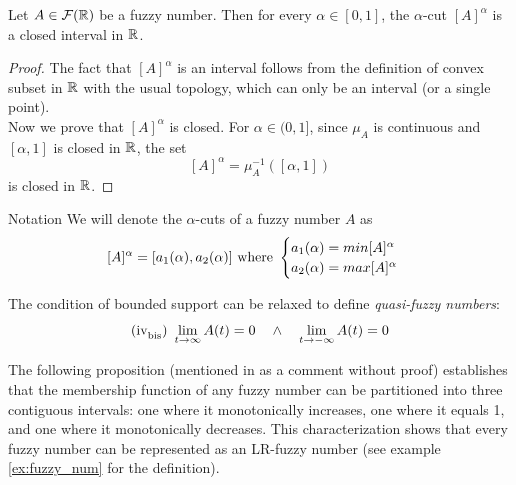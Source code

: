 \begin{proposition}
    Let $A\in \fuzzy{\R}$ be a fuzzy number. Then for every $\alpha \in [0,1]$, the $\alpha$-cut $[A]^\alpha$ is a closed interval in $\R$.
\end{proposition}

\begin{proof}
The fact that $[A]^\alpha$ is an interval follows from the definition of convex subset in $\R$ with the usual topology, which can only be an interval (or a single point).\\
Now we prove that $[A]^\alpha$ is closed. For $\alpha \in (0,1]$, since $\mu_A$ is continuous and $[\alpha, 1]$ is closed in $\R$, the set
\[
[A]^\alpha = \mu_A^{-1}([\alpha, 1])
\]
is closed in $\R$. %
\end{proof}

\begin{notation}{Notation}
    We will denote the $\alpha$-cuts of a fuzzy number $A$ as 
    \[[A]^\alpha=[a_1(\alpha),a_2(\alpha)]\textnormal{ where }\begin{cases}
        a_1(\alpha)=min[A]^\alpha&\\
        a_2(\alpha)=max[A]^\alpha&\\
    \end{cases}\]
\end{notation}

\begin{note}
The condition of bounded support can be relaxed to define \textit{quasi-fuzzy numbers}:
$$\textnormal{(iv}_{\textnormal{bis}}\textnormal{) } \lim{t}{\infty}A(t) = 0 \quad \land \quad \lim{t}{-\infty}A(t) = 0$$
\end{note}

The following proposition (mentioned in \cite[p.~3]{FULLER2} as a comment without proof) establishes that the membership function of any fuzzy number can be partitioned into three contiguous intervals: one where it monotonically increases, one where it equals 1, and one where it monotonically decreases. This characterization shows that every fuzzy number can be represented as an LR-fuzzy number (see example \ref{ex:fuzzy_num} for the definition).


